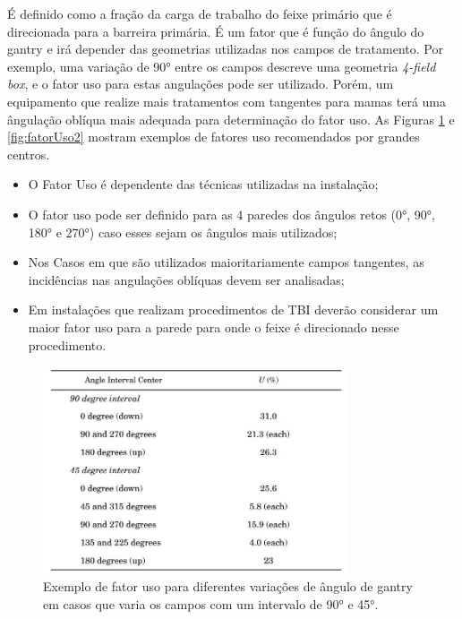 \documentclass[11pt,a4paper]{article}
\newcounter{exemplo}
\begin{document}
            É definido como a fração da carga de trabalho do feixe primário que é direcionada para a barreira primária. É um fator que é função do ângulo do gantry e irá depender das geometrias utilizadas nos campos de tratamento. Por exemplo, uma variação de \ang{90} entre os campos descreve uma geometria \textit{4-field box}, e o fator uso para estas angulações pode ser utilizado. Porém, um equipamento que realize mais tratamentos com tangentes para mamas terá uma ângulação oblíqua mais adequada para determinação do fator uso. As Figuras \ref{fig:fatorUso} e \ref{fig:fatorUso2} mostram exemplos de fatores uso recomendados por grandes centros.

            \begin{itemize}
                \item O Fator Uso é dependente das técnicas utilizadas na instalação;
                \item O fator uso pode ser definido para as 4 paredes dos ângulos retos (0°, 90°, 180° e 270°) caso esses sejam os ângulos mais utilizados;
                \item Nos Casos em que são utilizados maioritariamente campos tangentes, as incidências nas angulações oblíquas devem ser analisadas;
                \item Em instalações que realizam procedimentos de TBI deverão considerar um maior fator uso para a parede para onde o feixe é direcionado nesse procedimento.
            \end{itemize}

            \begin{figure}[h]
                \centering
                \includegraphics[width=0.8\textwidth]{Imagens/fatorUso.JPG}
                \caption{Exemplo de fator uso para diferentes variações de ângulo de gantry em casos que varia os campos com um intervalo de \ang{90} e \ang{45}.}
                \label{fig:fatorUso}
            \end{figure}
\end{document}
